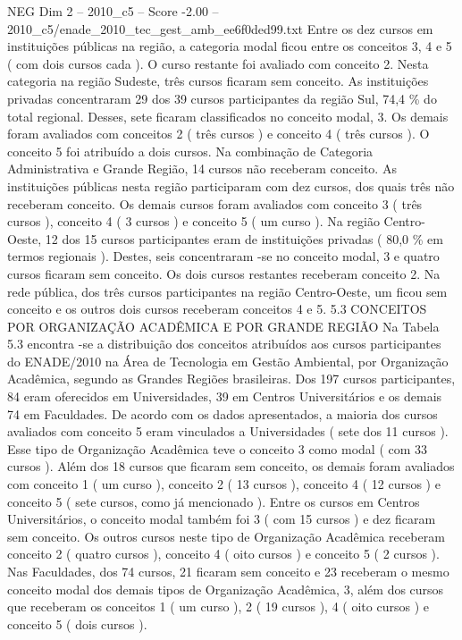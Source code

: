\begin{textsample}{NEG Dim 2 – 2010\_c5 – Score -2.00 – 2010\_c5/enade\_2010\_tec\_gest\_amb\_ee6f0ded99.txt}
Entre os dez cursos em instituições públicas na região, a categoria modal ficou entre os conceitos 3, 4 e 5 ( com dois cursos cada ).
O curso restante foi avaliado com conceito 2.
Nesta categoria na região Sudeste, três cursos ficaram sem conceito.
As instituições privadas concentraram 29 dos 39 cursos participantes da região Sul, 74,4 \% do total regional.
Desses, sete ficaram classificados no conceito modal, 3.
Os demais foram avaliados com conceitos 2 ( três cursos ) e conceito 4 ( três cursos ).
O conceito 5 foi atribuído a dois cursos.
Na combinação de Categoria Administrativa e Grande Região, 14 cursos não receberam conceito.
As instituições públicas nesta região participaram com dez cursos, dos quais três não receberam conceito.
Os demais cursos foram avaliados com conceito 3 ( três cursos ), conceito 4 ( 3 cursos ) e conceito 5 ( um curso ).
Na região Centro-Oeste, 12 dos 15 cursos participantes eram de instituições privadas ( 80,0 \% em termos regionais ).
Destes, seis concentraram -se no conceito modal, 3 e quatro cursos ficaram sem conceito.
Os dois cursos restantes receberam conceito 2.
Na rede pública, dos três cursos participantes na região Centro-Oeste, um ficou sem conceito e os outros dois cursos receberam conceitos 4 e 5. 5.3 CONCEITOS POR ORGANIZAÇÃO ACADÊMICA E POR GRANDE REGIÃO Na Tabela 5.3 encontra -se a distribuição dos conceitos atribuídos aos cursos participantes do ENADE/2010 na Área de Tecnologia em Gestão Ambiental, por Organização Acadêmica, segundo as Grandes Regiões brasileiras.
Dos 197 cursos participantes, 84 eram oferecidos em Universidades, 39 em Centros Universitários e os demais 74 em Faculdades.
De acordo com os dados apresentados, a maioria dos cursos avaliados com conceito 5 eram vinculados a Universidades ( sete dos 11 cursos ).
Esse tipo de Organização Acadêmica teve o conceito 3 como modal ( com 33 cursos ).
Além dos 18 cursos que ficaram sem conceito, os demais foram avaliados com conceito 1 ( um curso ), conceito 2 ( 13 cursos ), conceito 4 ( 12 cursos ) e conceito 5 ( sete cursos, como já mencionado ).
Entre os cursos em Centros Universitários, o conceito modal também foi 3 ( com 15 cursos ) e dez ficaram sem conceito.
Os outros cursos neste tipo de Organização Acadêmica receberam conceito 2 ( quatro cursos ), conceito 4 ( oito cursos ) e conceito 5 ( 2 cursos ).
Nas Faculdades, dos 74 cursos, 21 ficaram sem conceito e 23 receberam o mesmo conceito modal dos demais tipos de Organização Acadêmica, 3, além dos cursos que receberam os conceitos 1 ( um curso ), 2 ( 19 cursos ), 4 ( oito cursos ) e conceito 5 ( dois cursos ).

\end{textsample}
